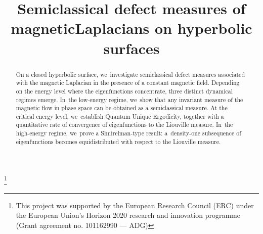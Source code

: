 \documentclass[JEP,XML,SOM,Unicode,published]{cedram}
\theoremstyle{plain}
\theoremstyle{definition}
\begin{document}
\title[Semiclassical measures of magnetic Laplacians]{Semiclassical defect measures of magnetic\nobreakspace Laplacians on hyperbolic surfaces}

\author[\initial{L.} \lastname{Charles}]{ }
\address{Université de Paris and Sorbonne Université, CNRS, IMJ-PRG,\\ F-75006 Paris, France}

\author[\initial{T.} \lastname{Lefeuvre}]{ }
\address{Université Paris-Saclay, Laboratoire de mathématiques d’Orsay\\ 91405 Orsay, France}

\thanks{This project was supported by the European Research Council (ERC) under the European Union’s Horizon 2020 research and innovation programme (Grant agreement no. 101162990 — ADG)}

\begin{abstract}
On a closed hyperbolic surface, we~investigate semiclassical defect measures associated with the magnetic Laplacian in the presence of a constant magnetic field. Depending on the energy level where the eigenfunctions concentrate, three distinct dynamical regimes emerge. In~the low-energy regime, we~show that any invariant measure of the magnetic flow in phase space can be obtained as a semiclassical measure. At the critical energy level, we~establish Quantum Unique Ergodicity, together with a quantitative rate of convergence of eigenfunctions to the Liouville measure. In~the high-energy regime, we~prove a Shnirelman-type result: a~density-one subsequence of eigenfunctions becomes equidistributed with respect to the Liouville measure.
\end{abstract}




\end{document}
